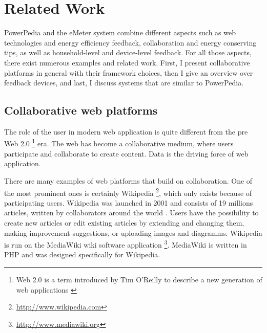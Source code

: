 \section{Related Work}
 

PowerPedia and the eMeter system combine different aspects such as web technologies and energy efficiency feedback, collaboration and energy conserving tips, as well as household-level and device-level feedback. For all those aspects, there exist numerous examples and related work.
First, I present collaborative platforms in general with their framework choices, then I give an overview over feedback devices, and last, I discuss systems that are similar to PowerPedia. 

\subsection{Collaborative web platforms}
The role of the user in modern web application is quite different from the pre Web 2.0 \footnote{Web 2.0 is a term introduced by Tim O'Reilly to describe a new generation of web applications \cite{web2_0}} era. The web has become a collaborative medium, where users participate and collaborate to create content. Data is the driving force of web application.

There are many examples of web platforms that build on collaboration. One of the most prominent ones is certainly Wikipedia \footnote{\url{http://www.wikipedia.com}}, which only exists because of participating users. Wikipedia was launched in 2001 and consists of 19 millions articles, written by collaborators around the world \cite{wikipedia}. Users have the possibility to create new articles or edit existing articles by extending and changing them, making improvement suggestions, or uploading images and diagramms. Wikipedia is run on the MediaWiki wiki software application \footnote{\url{http://www.mediawiki.org}}. MediaWiki is written in PHP and was designed specifically for Wikipedia. 

